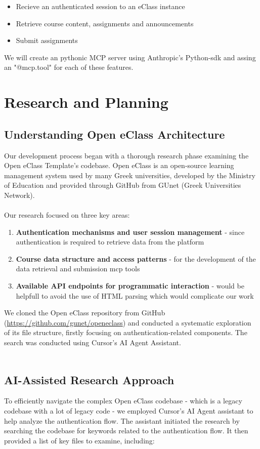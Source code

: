 \documentclass[11pt,a4paper]{article}
\begin{document}
\begin{itemize}
    \item Recieve an authenticated session to an eClass instance
    \item Retrieve course content, assignments and announcements
    \item Submit assignments
\end{itemize}
We will create an pythonic MCP server using Anthropic's Python-sdk and assing an "@mcp.tool" for each of these features.

\section{Research and Planning}
\subsection{Understanding Open eClass Architecture}
Our development process began with a thorough research phase examining the Open eClass Template's codebase. Open eClass is an open-source learning management system used by many Greek universities, developed by the Ministry of Education and provided through GitHub from GUnet (Greek Universities Network).
\\\\
Our research focused on three key areas:
\begin{enumerate}
    \item \textbf{Authentication mechanisms and user session management} - since authentication is required to retrieve data from the platform
    \item \textbf{Course data structure and access patterns} - for the development of the data retrieval and submission mcp tools
    \item \textbf{Available API endpoints for programmatic interaction} - would be helpfull to avoid the use of HTML parsing which would complicate our work
\end{enumerate}
We cloned the Open eClass repository from GitHub (\url{https://github.com/gunet/openeclass}) and conducted a systematic exploration of its file structure, firstly focusing on authentication-related components. The search was conducted using Cursor's AI Agent Assistant.
\\\\

\subsection{AI-Assisted Research Approach}
To efficiently navigate the complex Open eClass codebase - which is a legacy codebase with a lot of legacy code - we employed Cursor's AI Agent assistant to help analyze the authentication flow. The assistant initiated the research by searching the codebase for keywords related to the authentication flow. It then provided a list of key files to examine, including:
\end{document}

